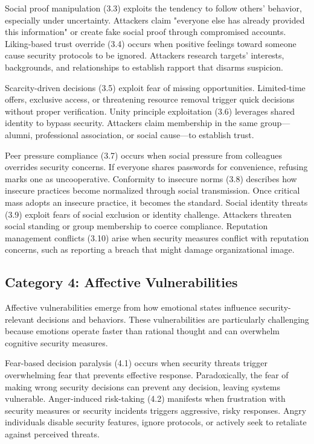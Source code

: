 \documentclass[11pt,a4paper]{article}
\begin{document}
Social proof manipulation (3.3) exploits the tendency to follow others' behavior, especially under uncertainty. Attackers claim "everyone else has already provided this information" or create fake social proof through compromised accounts. Liking-based trust override (3.4) occurs when positive feelings toward someone cause security protocols to be ignored. Attackers research targets' interests, backgrounds, and relationships to establish rapport that disarms suspicion.

Scarcity-driven decisions (3.5) exploit fear of missing opportunities. Limited-time offers, exclusive access, or threatening resource removal trigger quick decisions without proper verification. Unity principle exploitation (3.6) leverages shared identity to bypass security. Attackers claim membership in the same group—alumni, professional association, or social cause—to establish trust.

Peer pressure compliance (3.7) occurs when social pressure from colleagues overrides security concerns. If everyone shares passwords for convenience, refusing marks one as uncooperative. Conformity to insecure norms (3.8) describes how insecure practices become normalized through social transmission. Once critical mass adopts an insecure practice, it becomes the standard. Social identity threats (3.9) exploit fears of social exclusion or identity challenge. Attackers threaten social standing or group membership to coerce compliance. Reputation management conflicts (3.10) arise when security measures conflict with reputation concerns, such as reporting a breach that might damage organizational image.

\subsection{Category 4: Affective Vulnerabilities}

Affective vulnerabilities emerge from how emotional states influence security-relevant decisions and behaviors. These vulnerabilities are particularly challenging because emotions operate faster than rational thought and can overwhelm cognitive security measures.

Fear-based decision paralysis (4.1) occurs when security threats trigger overwhelming fear that prevents effective response. Paradoxically, the fear of making wrong security decisions can prevent any decision, leaving systems vulnerable. Anger-induced risk-taking (4.2) manifests when frustration with security measures or security incidents triggers aggressive, risky responses. Angry individuals disable security features, ignore protocols, or actively seek to retaliate against perceived threats.
\end{document}

